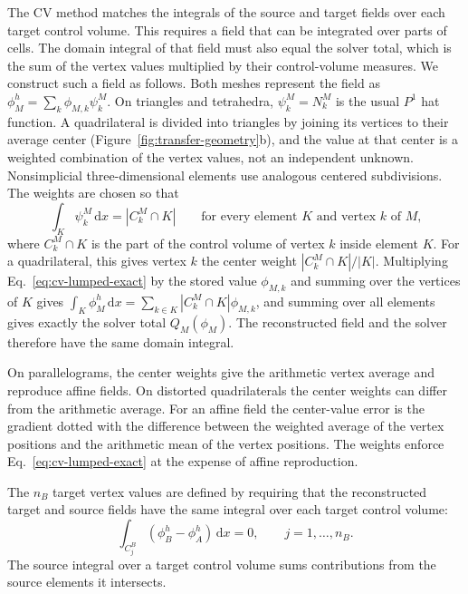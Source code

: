 \documentclass[a4paper,fleqn]{cas-sc}
\newcommand{\dd}{\,\mathrm{d}}
\begin{document}
The CV method matches the integrals of the source and target fields over each target control volume. This requires a field that can be integrated over parts of cells. The domain integral of that field must also equal the solver total, which is the sum of the vertex values multiplied by their control-volume measures. We construct such a field as follows. Both meshes represent the field as $\phi_M^h=\sum_k\phi_{M,k}\psi_k^M$. On triangles and tetrahedra, $\psi_k^M=N_k^M$ is the usual $P^1$ hat function. A quadrilateral is divided into triangles by joining its vertices to their average center (Figure~\ref{fig:transfer-geometry}b), and the value at that center is a weighted combination of the vertex values, not an independent unknown. Nonsimplicial three-dimensional elements use analogous centered subdivisions. The weights are chosen so that
\begin{equation}
 \int_K\psi_k^M\dd x=|C_k^M\cap K|
 \qquad\text{for every element $K$ and vertex $k$ of $M$,}
 \label{eq:cv-lumped-exact}
\end{equation}
where $C_k^M\cap K$ is the part of the control volume of vertex $k$ inside element $K$. For a quadrilateral, this gives vertex $k$ the center weight $|C_k^M\cap K|/|K|$. Multiplying Eq.~\eqref{eq:cv-lumped-exact} by the stored value $\phi_{M,k}$ and summing over the vertices of $K$ gives $\int_K\phi_M^h\dd x=\sum_{k\in K}|C_k^M\cap K|\phi_{M,k}$, and summing over all elements gives exactly the solver total $Q_M(\phi_M)$. The reconstructed field and the solver therefore have the same domain integral.

On parallelograms, the center weights give the arithmetic vertex average and reproduce affine fields. On distorted quadrilaterals the center weights can differ from the arithmetic average. For an affine field the center-value error is the gradient dotted with the difference between the weighted average of the vertex positions and the arithmetic mean of the vertex positions. The weights enforce Eq.~\eqref{eq:cv-lumped-exact} at the expense of affine reproduction.

The $n_B$ target vertex values are defined by requiring that the reconstructed target and source fields have the same integral over each target control volume:
\begin{equation}
 \int_{C_j^B}\left(\phi_B^h-\phi_A^h\right)\dd x=0,
 \qquad j=1,\ldots,n_B.
 \label{eq:cv-condition}
\end{equation}
The source integral over a target control volume sums contributions from the source elements it intersects.
\end{document}

